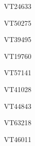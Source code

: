 \documentclass[17pt]{extarticle}
\begin{document}
\footnotesize
\vspace*{\fill}
\newpage{}
\vspace*{\fill}\begin{large}
VT24633 \\[0.5em]
\end{large}
\footnotesize
\vspace*{\fill}
\newpage{}
\vspace*{\fill}\begin{large}
VT50275 \\[0.5em]
\end{large}
\footnotesize
\vspace*{\fill}
\newpage{}
\vspace*{\fill}\begin{large}
VT39495 \\[0.5em]
\end{large}
\footnotesize
\vspace*{\fill}
\newpage{}
\vspace*{\fill}\begin{large}
VT19760 \\[0.5em]
\end{large}
\footnotesize
\vspace*{\fill}
\newpage{}
\vspace*{\fill}\begin{large}
VT57141 \\[0.5em]
\end{large}
\footnotesize
\vspace*{\fill}
\newpage{}
\vspace*{\fill}\begin{large}
VT41028 \\[0.5em]
\end{large}
\footnotesize
\vspace*{\fill}
\newpage{}
\vspace*{\fill}\begin{large}
VT44843 \\[0.5em]
\end{large}
\footnotesize
\vspace*{\fill}
\newpage{}
\vspace*{\fill}\begin{large}
VT63218 \\[0.5em]
\end{large}
\footnotesize
\vspace*{\fill}
\newpage{}
\vspace*{\fill}\begin{large}
VT46011 \\[0.5em]
\end{large}
\end{document}
